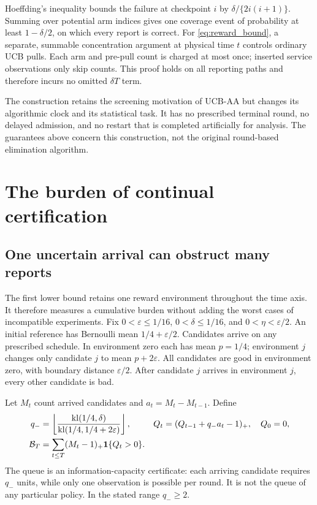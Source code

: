 \documentclass[11pt]{article}
\begin{document}
Hoeffding's inequality bounds the failure at checkpoint $i$ by
$\delta/\{2i(i+1)\}$. Summing over potential arm indices gives one coverage
event of probability at least $1-\delta/2$, on which every report is correct.
For \eqref{eq:reward_bound}, a separate, summable concentration argument at
physical time $t$ controls ordinary UCB pulls. Each arm and pre-pull count
is charged at most once; inserted service observations only skip counts.
This proof holds on all reporting paths and therefore incurs no omitted
$\delta T$ term. \suppproof

The construction retains the screening motivation of UCB-AA but changes its
algorithmic clock and its statistical task. It has no prescribed terminal round,
no delayed admission, and no restart that is completed artificially for analysis.
The guarantees above concern this construction, not the original round-based
elimination algorithm.
\section{The burden of continual certification}
\label{sec:maintenance}

\subsection{One uncertain arrival can obstruct many reports}

The first lower bound retains one reward environment throughout the time axis.
It therefore measures a cumulative burden without adding the worst cases of
incompatible experiments. Fix
$0<\varepsilon\le1/16$, $0<\delta\le1/16$, and $0<\eta<\varepsilon/2$.
An initial reference has Bernoulli mean $1/4+\varepsilon/2$. Candidates arrive
on any prescribed schedule. In environment zero each has mean $p=1/4$;
environment $j$ changes only candidate $j$ to mean $p+2\varepsilon$.
All candidates are good in environment zero, with boundary distance
$\varepsilon/2$. After candidate $j$ arrives in environment $j$, every other
candidate is bad.

Let $M_t$ count arrived candidates and $a_t=M_t-M_{t-1}$. Define
\begin{align}
 q_-&=\left\lfloor\frac{\operatorname{kl}(1/4,\delta)}
                              {\operatorname{kl}(1/4,1/4+2\varepsilon)}\right\rfloor,
 &Q_t&=(Q_{t-1}+q_-a_t-1)_+,\quad Q_0=0,\notag\\
 \mathcal B_T&=\sum_{t\le T}(M_t-1)_+\mathbf 1\{Q_t>0\}.
 \label{eq:broadcast_queue}
\end{align}
The queue is an information-capacity certificate: each arriving candidate
requires $q_-$ units, while only one observation is possible per round. It is
not the queue of any particular policy. In the stated range $q_-\ge2$.
\end{document}

